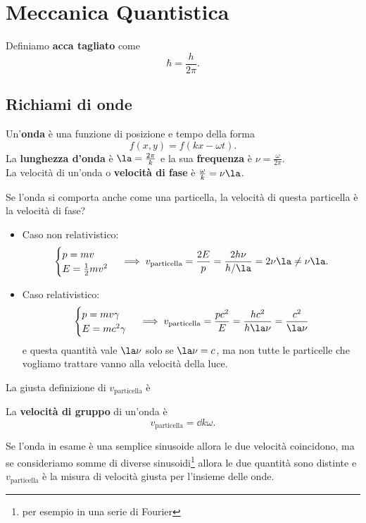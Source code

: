 \chapter{Meccanica Quantistica}

\begin{definition}
Definiamo \textbf{acca tagliato} come
\[\hbar=\frac h{2\pi}.\]
\end{definition}

\section{Richiami di onde}
\begin{definition}[Onda]
Un'\textbf{onda} \`e una funzione di posizione e tempo della forma
\[f(x,y)=f(kx-\omega t).\]
La \textbf{lunghezza d'onda} \`e $\la=\frac{2\pi}k$ e la sua \textbf{frequenza} \`e $\nu=\frac\omega{2\pi}$.\\
La velocit\`a di un'onda o \textbf{velocit\`a di fase} \`e $\frac{\omega}k=\nu\la$.
\end{definition}

\noindent
Se l'onda si comporta anche come una particella, la velocit\`a di questa particella \`e la velocit\`a di fase?
\begin{itemize}
\item Caso non relativistico:
\[\begin{cases}
p=mv\\
E=\frac12mv^2
\end{cases}\implies v_{\text{particella}}=\frac{2E}p=\frac{2h\nu}{h/\la}=2\nu\la\neq \nu\la.\]
\item Caso relativistico:
\[\begin{cases}
p=mv\gamma\\
E=mc^2\gamma
\end{cases}\implies v_{\text{particella}}=\frac{pc^2}E=\frac{hc^2}{h\la\nu}=\frac{c^2}{\la\nu}\]
e questa quantit\`a vale $\la\nu$ solo se $\la\nu=c$, ma non tutte le particelle che vogliamo trattare vanno alla velocit\`a della luce.
\end{itemize}
\noindent La giusta definizione di $v_{\text{particella}}$ \`e

\begin{definition}
La \textbf{velocit\`a di gruppo} di un'onda \`e
\[v_{\text{particella}}=\dd k\omega.\]
\end{definition}

\noindent
Se l'onda in esame \`e una semplice sinusoide allora le due velocit\`a coincidono, ma se consideriamo somme di diverse sinusoidi\footnote{per esempio in una serie di Fourier} allora le due quantit\`a sono distinte e $v_{\text{particella}}$ \`e la misura di velocit\`a giusta per l'insieme delle onde.


